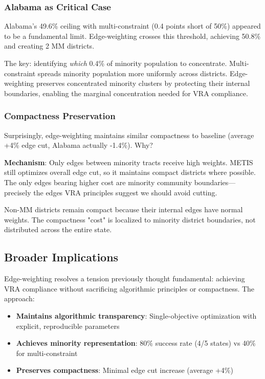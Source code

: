 \subsubsection{Alabama as Critical Case}

Alabama's 49.6\% ceiling with multi-constraint (0.4 points short of 50\%) appeared to be a fundamental limit. Edge-weighting crosses this threshold, achieving 50.8\% and creating 2 MM districts.

The key: identifying \textit{which} 0.4\% of minority population to concentrate. Multi-constraint spreads minority population more uniformly across districts. Edge-weighting preserves concentrated minority clusters by protecting their internal boundaries, enabling the marginal concentration needed for VRA compliance.

\subsubsection{Compactness Preservation}

Surprisingly, edge-weighting maintains similar compactness to baseline (average +4\% edge cut, Alabama actually -1.4\%). Why?

\textbf{Mechanism}: Only edges between minority tracts receive high weights. METIS still optimizes overall edge cut, so it maintains compact districts where possible. The only edges bearing higher cost are minority community boundaries—precisely the edges VRA principles suggest we should avoid cutting.

Non-MM districts remain compact because their internal edges have normal weights. The compactness "cost" is localized to minority district boundaries, not distributed across the entire state.

\subsection{Broader Implications}

Edge-weighting resolves a tension previously thought fundamental: achieving VRA compliance without sacrificing algorithmic principles or compactness. The approach:

\begin{itemize}
\item \textbf{Maintains algorithmic transparency}: Single-objective optimization with explicit, reproducible parameters
\item \textbf{Achieves minority representation}: 80\% success rate (4/5 states) vs 40\% for multi-constraint
\item \textbf{Preserves compactness}: Minimal edge cut increase (average +4\%)
\end{itemize}

